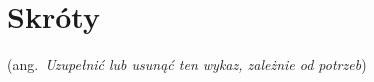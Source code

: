 \chapter*{Skróty}
\label{sec:skroty}
\noindent\vspace{-\topsep-\partopsep-\parsep} %
\begin{description}[labelwidth=*]
  \item [TODO] (ang.\ \emph{Uzupełnić lub usunąć ten wykaz, zależnie od potrzeb})
\end{description}
